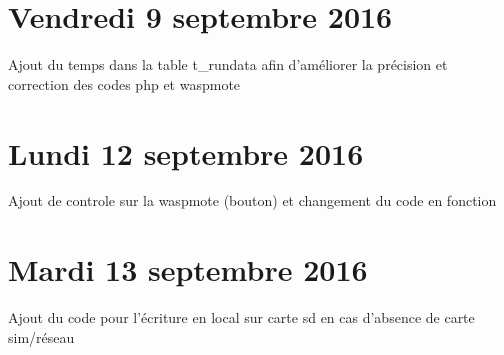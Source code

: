 \documentclass[a4paper,11pt]{article}
\begin{document}
\section{Vendredi 9 septembre 2016}
Ajout du temps dans la table t\_rundata afin d'améliorer la précision et correction des codes php et waspmote

\section{Lundi 12 septembre 2016}
Ajout de controle sur la waspmote (bouton) et changement du code en fonction

\section{Mardi 13 septembre 2016}
Ajout du code pour l'écriture en local sur carte sd en cas d'absence de carte sim/réseau
\end{document}
